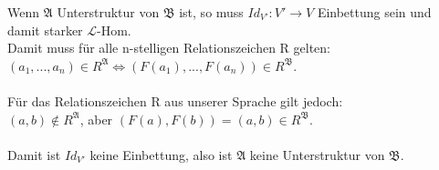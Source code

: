 \documentclass[a4paper]{scrartcl}
\begin{document}
\begin{itemize}
            Wenn $\mathfrak{A}$ Unterstruktur von $\mathfrak{B}$ ist, so muss $Id_{V'}: V' \rightarrow V$ Einbettung sein und damit starker $\mathscr{L}$-Hom.\\
            Damit muss für alle n-stelligen Relationszeichen R gelten:\\
            $(a_1,...,a_n) \in R^\mathfrak{A} \Leftrightarrow (F(a_1),...,F(a_n)) \in R^\mathfrak{B}$.\\

            \\Für das Relationszeichen R aus unserer Sprache gilt jedoch:\\
            $(a,b) \notin R^\mathfrak{A}$, aber $(F(a), F(b)) = (a, b) \in R^\mathfrak{B}$.\\
            
            \\Damit ist $Id_{V'}$ keine Einbettung, also ist $\mathfrak{A}$ keine Unterstruktur von $\mathfrak{B}$.
        
    \end{itemize}
\end{document}
